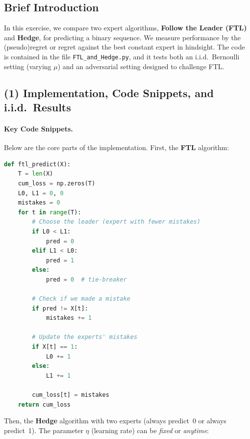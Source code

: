 \subsection*{Brief Introduction}
In this exercise, we compare two expert algorithms, \textbf{Follow the Leader (FTL)} and \textbf{Hedge}, for predicting a binary sequence. We measure performance by the (pseudo)regret or regret against the best constant expert in hindsight. The code is contained in the file \texttt{FTL\_and\_Hedge.py}, and it tests both an i.i.d.\ Bernoulli setting (varying \(\mu\)) and an adversarial setting designed to challenge FTL.

\subsection{(1) Implementation, Code Snippets, and i.i.d.\ Results}

\paragraph{Key Code Snippets.}
Below are the core parts of the implementation.  First, the \textbf{FTL} algorithm:

\begin{lstlisting}[language=Python, caption={FTL implementation.}]
def ftl_predict(X):
    T = len(X)
    cum_loss = np.zeros(T)
    L0, L1 = 0, 0
    mistakes = 0
    for t in range(T):
        # Choose the leader (expert with fewer mistakes)
        if L0 < L1:
            pred = 0
        elif L1 < L0:
            pred = 1
        else:
            pred = 0  # tie-breaker

        # Check if we made a mistake
        if pred != X[t]:
            mistakes += 1

        # Update the experts' mistakes
        if X[t] == 1:
            L0 += 1
        else:
            L1 += 1

        cum_loss[t] = mistakes
    return cum_loss
\end{lstlisting}

Then, the \textbf{Hedge} algorithm with two experts (always predict~0 or always predict~1).  The parameter \(\eta\) (learning rate) can be \emph{fixed} or \emph{anytime}:

